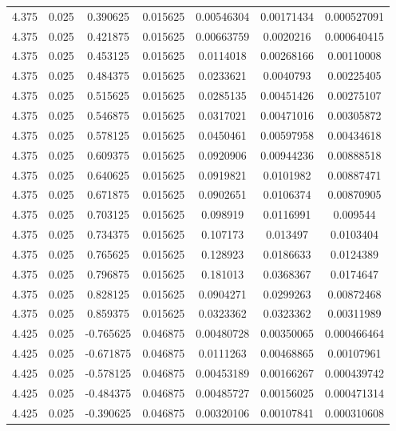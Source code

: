 \begin{table}[bh]
\begin{center}
{\begin{tabular}{ccccccc}
4.375	 & 0.025 & 	0.390625	 & 0.015625	 & 0.00546304	 & 0.00171434	 & 0.000527091 \\ 
4.375	 & 0.025 & 	0.421875	 & 0.015625	 & 0.00663759	 & 0.0020216	 & 0.000640415 \\ 
4.375	 & 0.025 & 	0.453125	 & 0.015625	 & 0.0114018	 & 0.00268166	 & 0.00110008 \\ 
4.375	 & 0.025 & 	0.484375	 & 0.015625	 & 0.0233621	 & 0.0040793	 & 0.00225405 \\ 
4.375	 & 0.025 & 	0.515625	 & 0.015625	 & 0.0285135	 & 0.00451426	 & 0.00275107 \\ 
4.375	 & 0.025 & 	0.546875	 & 0.015625	 & 0.0317021	 & 0.00471016	 & 0.00305872 \\ 
4.375	 & 0.025 & 	0.578125	 & 0.015625	 & 0.0450461	 & 0.00597958	 & 0.00434618 \\ 
4.375	 & 0.025 & 	0.609375	 & 0.015625	 & 0.0920906	 & 0.00944236	 & 0.00888518 \\ 
4.375	 & 0.025 & 	0.640625	 & 0.015625	 & 0.0919821	 & 0.0101982	 & 0.00887471 \\ 
4.375	 & 0.025 & 	0.671875	 & 0.015625	 & 0.0902651	 & 0.0106374	 & 0.00870905 \\ 
4.375	 & 0.025 & 	0.703125	 & 0.015625	 & 0.098919	 & 0.0116991	 & 0.009544 \\ 
4.375	 & 0.025 & 	0.734375	 & 0.015625	 & 0.107173	 & 0.013497	 & 0.0103404 \\ 
4.375	 & 0.025 & 	0.765625	 & 0.015625	 & 0.128923	 & 0.0186633	 & 0.0124389 \\ 
4.375	 & 0.025 & 	0.796875	 & 0.015625	 & 0.181013	 & 0.0368367	 & 0.0174647 \\ 
4.375	 & 0.025 & 	0.828125	 & 0.015625	 & 0.0904271	 & 0.0299263	 & 0.00872468 \\ 
4.375	 & 0.025 & 	0.859375	 & 0.015625	 & 0.0323362	 & 0.0323362	 & 0.00311989 \\ 
4.425	 & 0.025 & 	-0.765625	 & 0.046875	 & 0.00480728	 & 0.00350065	 & 0.000466464 \\ 
4.425	 & 0.025 & 	-0.671875	 & 0.046875	 & 0.0111263	 & 0.00468865	 & 0.00107961 \\ 
4.425	 & 0.025 & 	-0.578125	 & 0.046875	 & 0.00453189	 & 0.00166267	 & 0.000439742 \\ 
4.425	 & 0.025 & 	-0.484375	 & 0.046875	 & 0.00485727	 & 0.00156025	 & 0.000471314 \\ 
4.425	 & 0.025 & 	-0.390625	 & 0.046875	 & 0.00320106	 & 0.00107841	 & 0.000310608 \\ 

\end{tabular}}
\end{center}
\end{table}

